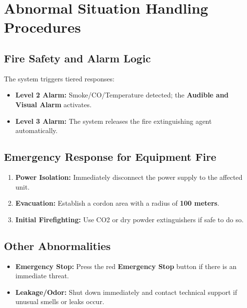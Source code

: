 \documentclass[11pt, a4paper]{article}
\begin{document}
\section{Abnormal Situation Handling Procedures}

\subsection{Fire Safety and Alarm Logic}
The system triggers tiered responses:
\begin{itemize}
    \item \textbf{Level 2 Alarm:} Smoke/CO/Temperature detected; the \textbf{Audible and Visual Alarm} activates.
    \item \textbf{Level 3 Alarm:} The system releases the fire extinguishing agent automatically.
\end{itemize}

\subsection{Emergency Response for Equipment Fire}
\begin{enumerate}
    \item \textbf{Power Isolation:} Immediately disconnect the power supply to the affected unit.
    \item \textbf{Evacuation:} Establish a cordon area with a radius of \textbf{100 meters}.
    \item \textbf{Initial Firefighting:} Use CO2 or dry powder extinguishers if safe to do so.
\end{enumerate}

\subsection{Other Abnormalities}
\begin{itemize}
    \item \textbf{Emergency Stop:} Press the red \textbf{Emergency Stop} button if there is an immediate threat.
    \item \textbf{Leakage/Odor:} Shut down immediately and contact technical support if unusual smells or leaks occur.
\end{itemize}
\end{document}
